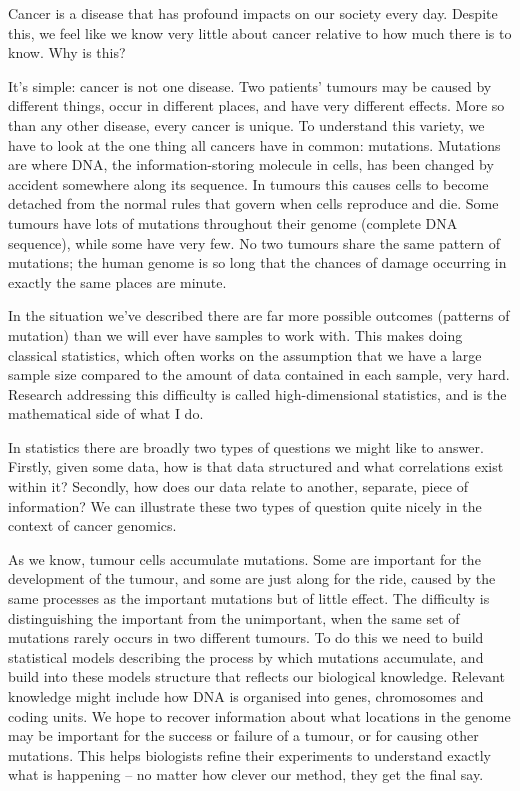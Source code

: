 \documentclass[10pt,twoside,openright]{report}
\begin{document}
Cancer is a disease that has profound impacts on our society every day. Despite this, we feel like we know very little about cancer relative to how much there is to know. Why is this? 

It’s simple: cancer is not one disease. Two patients’ tumours may be caused by different things, occur in different places, and have very different effects. More so than any other disease, every cancer is unique. To understand this variety, we have to look at the one thing all cancers have in common: mutations. Mutations are where DNA, the information-storing molecule in cells, has been changed by accident somewhere along its sequence. In tumours this causes cells to become detached from the normal rules that govern when cells reproduce and die. Some tumours have lots of mutations throughout their genome (complete DNA sequence), while some have very few. No two tumours share the same pattern of mutations; the human genome is so long that the chances of damage occurring in exactly the same places are minute.

In the situation we've described there are far more possible outcomes (patterns of mutation) than we will ever have samples to work with. This makes doing classical statistics, which often works on the assumption that we have a large sample size compared to the amount of data contained in each sample, very hard. Research addressing this difficulty is called high-dimensional statistics, and is the mathematical side of what I do. 

In statistics there are broadly two types of questions we might like to answer. Firstly, given some data, how is that data structured and what correlations exist within it? Secondly, how does our data relate to another, separate, piece of information? We can illustrate these two types of question quite nicely in the context of cancer genomics.

As we know, tumour cells accumulate mutations. Some are important for the development of the tumour, and some are just along for the ride, caused by the same processes as the important mutations but of little effect. The difficulty is distinguishing the important from the unimportant, when the same set of mutations rarely occurs in two different tumours. To do this we need to build statistical models describing the process by which mutations accumulate, and build into these models structure that reflects our biological knowledge. Relevant knowledge might include how DNA is organised into genes, chromosomes and coding units.  We hope to recover information about what locations in the genome may be important for the success or failure of a tumour, or for causing other mutations. This helps biologists refine their experiments to understand exactly what is happening – no matter how clever our method, they get the final say.
\end{document}
